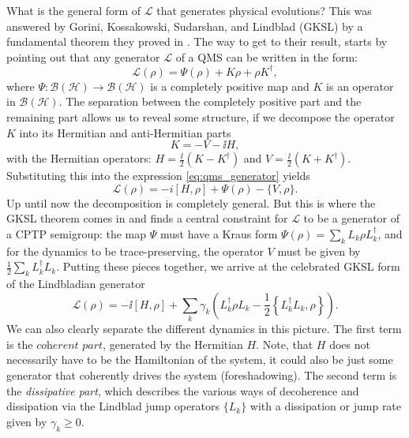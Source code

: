What is the general form of $\mathcal{L}$ that generates physical evolutions? This was answered by Gorini, Kossakowski, Sudarshan, and Lindblad (GKSL) by a fundamental theorem they proved in \cite{gorini1976completely,lindblad1976generators}. The way to get to their result, starts by pointing out that any generator $\mathcal{L}$ of a QMS can be written in the form:
\begin{equation}
    \label{eq:qms_generator}
\mathcal{L}(\rho) = \Psi(\rho) + K\rho + \rho K^\dagger,
\end{equation}
where $\Psi: \mathcal{B}(\mathcal{H})\rightarrow \mathcal{B}(\mathcal{H})$ is a completely positive map and $K$ is an operator in $\mathcal{B}(\mathcal{H})$. The separation between the completely positive part and the remaining part allows us to reveal some structure, if we decompose the operator $K$ into its Hermitian and anti-Hermitian parts
\begin{equation}
    K = -V - \ii H,
\end{equation}
with the Hermitian operators: $H = \frac{\ii}{2}(K - K^\dagger)$ and $V = \frac{\ii}{2}(K + K^\dagger)$. Substituting this into the expression \eqref{eq:qms_generator} yields
\begin{equation}
\mathcal{L}(\rho) = -i[H, \rho] + \Psi(\rho) - \{V, \rho\}.
\end{equation}
Up until now the decomposition is completely general. But this is where the GKSL theorem comes in and finds a central constraint for $\mathcal{L}$ to be a generator of a CPTP semigroup: the map $\Psi$ must have a Kraus form $\Psi(\rho) = \sum_k L_k \rho L_k^\dagger$, and for the dynamics to be trace-preserving, the operator $V$ must be given by $\frac{1}{2}\sum_k L_k^\dagger L_k$. Putting these pieces together, we arrive at the celebrated GKSL form of the Lindbladian generator
\begin{equation}
    \label{eq:lindblad-generator}
    \mathcal{L}(\rho) = -\ii [H, \rho] + \sum_{k}\gamma_k \left(L_k^\dagger \rho L_k - \frac{1}{2}\left\{L_k^\dagger L_k, \rho\right\}\right).
\end{equation}
We can also clearly separate the different dynamics in this picture. The first term is the $\textit{coherent part}$, generated by the Hermitian $H$. Note, that $H$ does not necessarily have to be the Hamiltonian of the system, it could also be just some generator that coherently drives the system (foreshadowing). The second term is the \textit{dissipative part}, which describes the various ways of decoherence and dissipation via the Lindblad jump operators $\{L_k\}$ with a dissipation or jump rate given by $\gamma_k \geq 0$.

